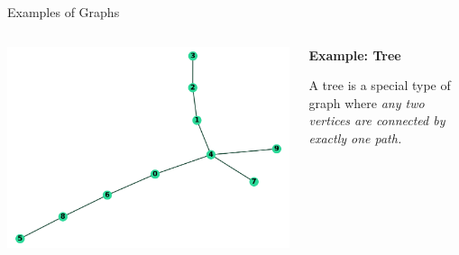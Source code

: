 \documentclass[unknownkeysallowed]{beamer}
\begin{document}
\begin{frame}{Examples of Graphs}

\begin{columns}

\begin{column}{.6\textwidth}
\includegraphics[width=.8\linewidth,valign=t]{assets/tree}
\end{column}

\begin{column}{.4\textwidth}
\textbf{Example: Tree}

\vspace{5pt}

A tree is a special type of graph where {\it any two vertices are connected by exactly one path.}
\end{column}

\end{columns}

\end{frame}

\end{document}
